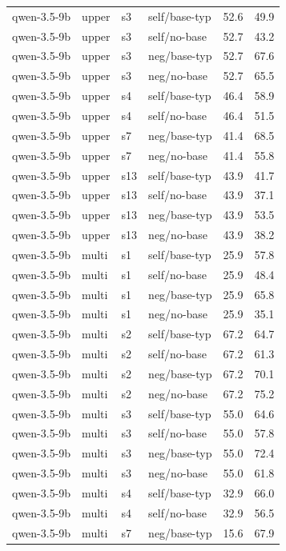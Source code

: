{\begin{longtable}{llll rr}
qwen-3.5-9b & upper & s3 & self/base-typ & 52.6 & 49.9 \\
qwen-3.5-9b & upper & s3 & self/no-base & 52.7 & 43.2 \\
qwen-3.5-9b & upper & s3 & neg/base-typ & 52.7 & 67.6 \\
qwen-3.5-9b & upper & s3 & neg/no-base & 52.7 & 65.5 \\
qwen-3.5-9b & upper & s4 & self/base-typ & 46.4 & 58.9 \\
qwen-3.5-9b & upper & s4 & self/no-base & 46.4 & 51.5 \\
qwen-3.5-9b & upper & s7 & neg/base-typ & 41.4 & 68.5 \\
qwen-3.5-9b & upper & s7 & neg/no-base & 41.4 & 55.8 \\
qwen-3.5-9b & upper & s13 & self/base-typ & 43.9 & 41.7 \\
qwen-3.5-9b & upper & s13 & self/no-base & 43.9 & 37.1 \\
qwen-3.5-9b & upper & s13 & neg/base-typ & 43.9 & 53.5 \\
qwen-3.5-9b & upper & s13 & neg/no-base & 43.9 & 38.2 \\
\midrule
qwen-3.5-9b & multi & s1 & self/base-typ & 25.9 & 57.8 \\
qwen-3.5-9b & multi & s1 & self/no-base & 25.9 & 48.4 \\
qwen-3.5-9b & multi & s1 & neg/base-typ & 25.9 & 65.8 \\
qwen-3.5-9b & multi & s1 & neg/no-base & 25.9 & 35.1 \\
qwen-3.5-9b & multi & s2 & self/base-typ & 67.2 & 64.7 \\
qwen-3.5-9b & multi & s2 & self/no-base & 67.2 & 61.3 \\
qwen-3.5-9b & multi & s2 & neg/base-typ & 67.2 & 70.1 \\
qwen-3.5-9b & multi & s2 & neg/no-base & 67.2 & 75.2 \\
qwen-3.5-9b & multi & s3 & self/base-typ & 55.0 & 64.6 \\
qwen-3.5-9b & multi & s3 & self/no-base & 55.0 & 57.8 \\
qwen-3.5-9b & multi & s3 & neg/base-typ & 55.0 & 72.4 \\
qwen-3.5-9b & multi & s3 & neg/no-base & 55.0 & 61.8 \\
qwen-3.5-9b & multi & s4 & self/base-typ & 32.9 & 66.0 \\
qwen-3.5-9b & multi & s4 & self/no-base & 32.9 & 56.5 \\
qwen-3.5-9b & multi & s7 & neg/base-typ & 15.6 & 67.9 \\

\end{longtable}}
